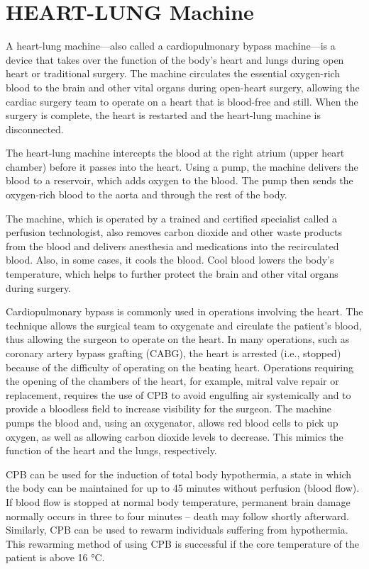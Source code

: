 \documentclass[12pt]{article}
\begin{document}
\newpage

\section{HEART-LUNG Machine}

A heart-lung machine—also called a cardiopulmonary bypass machine—is a device that takes over the function of the body’s heart and lungs during open heart or traditional surgery. The machine circulates the essential oxygen-rich blood to the brain and other vital organs during open-heart surgery, allowing the cardiac surgery team to operate on a heart that is blood-free and still. When the surgery is complete, the heart is restarted and the heart-lung machine is disconnected.

\indent

The heart-lung machine intercepts the blood at the right atrium (upper heart chamber) before it passes into the heart. Using a pump, the machine delivers the blood to a reservoir, which adds oxygen to the blood. The pump then sends the oxygen-rich blood to the aorta and through the rest of the body.
\indent

The machine, which is operated by a trained and certified specialist called a perfusion technologist, also removes carbon dioxide and other waste products from the blood and delivers anesthesia and medications into the recirculated blood. Also, in some cases, it cools the blood. Cool blood lowers the body’s temperature, which helps to further protect the brain and other vital organs during surgery.

\indent

Cardiopulmonary bypass is commonly used in operations involving the heart. The technique allows the surgical team to oxygenate and circulate the patient's blood, thus allowing the surgeon to operate on the heart. In many operations, such as coronary artery bypass grafting (CABG), the heart is arrested (i.e., stopped) because of the difficulty of operating on the beating heart. Operations requiring the opening of the chambers of the heart, for example, mitral valve repair or replacement, requires the use of CPB to avoid engulfing air systemically and to provide a bloodless field to increase visibility for the surgeon. The machine pumps the blood and, using an oxygenator, allows red blood cells to pick up oxygen, as well as allowing carbon dioxide levels to decrease. This mimics the function of the heart and the lungs, respectively.
\indent

CPB can be used for the induction of total body hypothermia, a state in which the body can be maintained for up to 45 minutes without perfusion (blood flow). If blood flow is stopped at normal body temperature, permanent brain damage normally occurs in three to four minutes – death may follow shortly afterward. Similarly, CPB can be used to rewarm individuals suffering from hypothermia. This rewarming method of using CPB is successful if the core temperature of the patient is above 16 °C.
\end{document}
